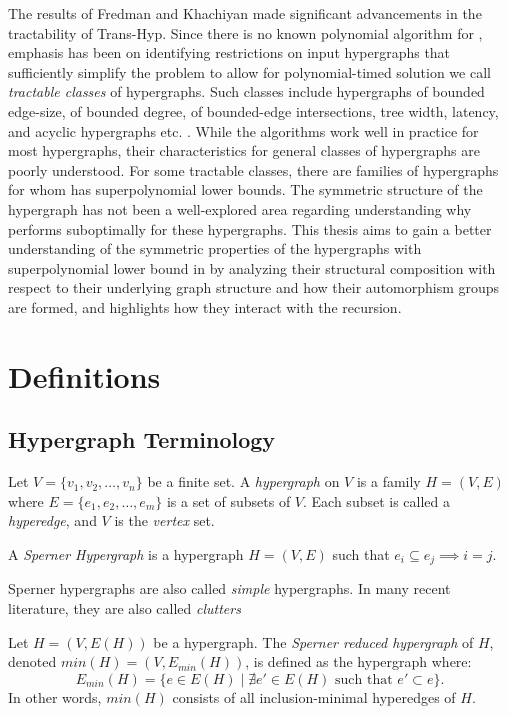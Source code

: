 The results of Fredman and Khachiyan made significant advancements in the tractability of Trans-Hyp. Since there is no known polynomial algorithm for \TransHyp, emphasis has been on identifying restrictions on input hypergraphs that sufficiently simplify the problem to allow for polynomial-timed solution we call \emph{tractable classes} of hypergraphs. Such classes include hypergraphs of bounded edge-size, of bounded degree, of bounded-edge intersections, tree width, latency, and acyclic hypergraphs etc. \cite{EMG08}. While the algorithms work well in practice for most hypergraphs, their characteristics for general classes of hypergraphs are poorly understood. For some tractable classes, there are families of hypergraphs for whom \FKA{} has superpolynomial lower bounds. The symmetric structure of the hypergraph has not been a well-explored area regarding understanding why \FKA{} performs suboptimally for these hypergraphs. This thesis aims to gain a better understanding of the symmetric properties of the hypergraphs with superpolynomial lower bound in \FKA{} by analyzing their structural composition with respect to their underlying graph structure and how their automorphism groups are formed, and highlights how they interact with the \FKA{} recursion.

\section{Definitions}

\subsection{Hypergraph Terminology}

\begin{definition}
Let $V=\{v_1,v_2,\dots,v_n\}$ be a finite set. A \emph{hypergraph} on $V$ is a family $H=(V,E)$ where $E=\{e_1,e_2,\dots,e_m\}$ is a set of subsets of $V$. Each subset is called a \emph{hyperedge}, and $V$ is the \emph{vertex} set.
\end{definition}

\begin{definition}
A \emph{Sperner Hypergraph} is a hypergraph $H=(V,E)$ such that $e_i\subseteq e_j\implies i=j$.
\end{definition}

Sperner hypergraphs are also called \emph{simple} hypergraphs. In many recent literature, they are also called \emph{clutters}

\begin{definition}\label{def:sperner-reduction}
Let $H=(V,E(H))$ be a hypergraph. The \emph{Sperner reduced hypergraph} of $H$, denoted $min(H)=(V,E_{min}(H))$, is defined as the hypergraph where:
\[
E_{min}(H)=\{e\in E(H)\mid \nexists e'\in E(H)\text{ such that }e'\subset e\}.
\]
In other words, $min(H)$ consists of all inclusion-minimal hyperedges of $H$.
\end{definition}

